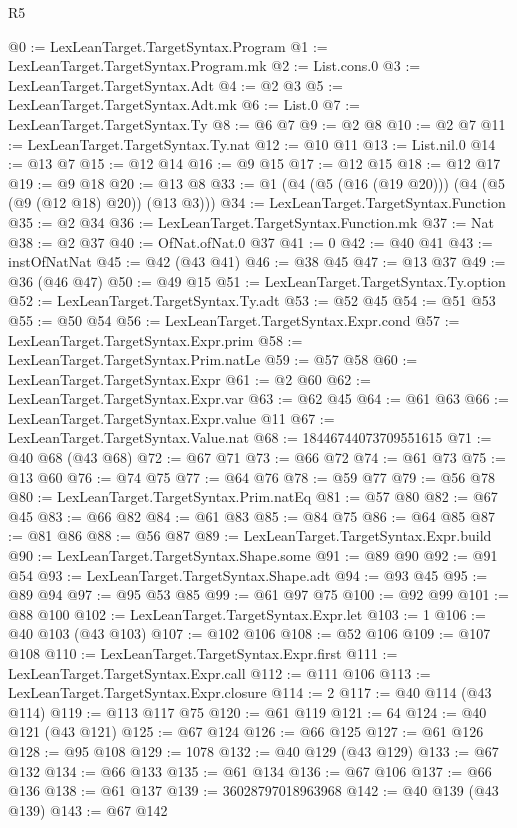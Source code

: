 \begin{lexlean}{R5}
\begin{coremodule}
@0 := LexLeanTarget.TargetSyntax.Program
@1 := LexLeanTarget.TargetSyntax.Program.mk
@2 := List.cons.{0}
@3 := LexLeanTarget.TargetSyntax.Adt
@4 := @2 @3
@5 := LexLeanTarget.TargetSyntax.Adt.mk
@6 := List.{0}
@7 := LexLeanTarget.TargetSyntax.Ty
@8 := @6 @7
@9 := @2 @8
@10 := @2 @7
@11 := LexLeanTarget.TargetSyntax.Ty.nat
@12 := @10 @11
@13 := List.nil.{0}
@14 := @13 @7
@15 := @12 @14
@16 := @9 @15
@17 := @12 @15
@18 := @12 @17
@19 := @9 @18
@20 := @13 @8
@33 := @1 (@4 (@5 (@16 (@19 @20))) (@4 (@5 (@9 (@12 @18) @20)) (@13 @3)))
@34 := LexLeanTarget.TargetSyntax.Function
@35 := @2 @34
@36 := LexLeanTarget.TargetSyntax.Function.mk
@37 := Nat
@38 := @2 @37
@40 := OfNat.ofNat.{0} @37
@41 := 0
@42 := @40 @41
@43 := instOfNatNat
@45 := @42 (@43 @41)
@46 := @38 @45
@47 := @13 @37
@49 := @36 (@46 @47)
@50 := @49 @15
@51 := LexLeanTarget.TargetSyntax.Ty.option
@52 := LexLeanTarget.TargetSyntax.Ty.adt
@53 := @52 @45
@54 := @51 @53
@55 := @50 @54
@56 := LexLeanTarget.TargetSyntax.Expr.cond
@57 := LexLeanTarget.TargetSyntax.Expr.prim
@58 := LexLeanTarget.TargetSyntax.Prim.natLe
@59 := @57 @58
@60 := LexLeanTarget.TargetSyntax.Expr
@61 := @2 @60
@62 := LexLeanTarget.TargetSyntax.Expr.var
@63 := @62 @45
@64 := @61 @63
@66 := LexLeanTarget.TargetSyntax.Expr.value @11
@67 := LexLeanTarget.TargetSyntax.Value.nat
@68 := 18446744073709551615
@71 := @40 @68 (@43 @68)
@72 := @67 @71
@73 := @66 @72
@74 := @61 @73
@75 := @13 @60
@76 := @74 @75
@77 := @64 @76
@78 := @59 @77
@79 := @56 @78
@80 := LexLeanTarget.TargetSyntax.Prim.natEq
@81 := @57 @80
@82 := @67 @45
@83 := @66 @82
@84 := @61 @83
@85 := @84 @75
@86 := @64 @85
@87 := @81 @86
@88 := @56 @87
@89 := LexLeanTarget.TargetSyntax.Expr.build
@90 := LexLeanTarget.TargetSyntax.Shape.some
@91 := @89 @90
@92 := @91 @54
@93 := LexLeanTarget.TargetSyntax.Shape.adt
@94 := @93 @45
@95 := @89 @94
@97 := @95 @53 @85
@99 := @61 @97 @75
@100 := @92 @99
@101 := @88 @100
@102 := LexLeanTarget.TargetSyntax.Expr.let
@103 := 1
@106 := @40 @103 (@43 @103)
@107 := @102 @106
@108 := @52 @106
@109 := @107 @108
@110 := LexLeanTarget.TargetSyntax.Expr.first
@111 := LexLeanTarget.TargetSyntax.Expr.call
@112 := @111 @106
@113 := LexLeanTarget.TargetSyntax.Expr.closure
@114 := 2
@117 := @40 @114 (@43 @114)
@119 := @113 @117 @75
@120 := @61 @119
@121 := 64
@124 := @40 @121 (@43 @121)
@125 := @67 @124
@126 := @66 @125
@127 := @61 @126
@128 := @95 @108
@129 := 1078
@132 := @40 @129 (@43 @129)
@133 := @67 @132
@134 := @66 @133
@135 := @61 @134
@136 := @67 @106
@137 := @66 @136
@138 := @61 @137
@139 := 36028797018963968
@142 := @40 @139 (@43 @139)
@143 := @67 @142

\end{coremodule}
\end{lexlean}
